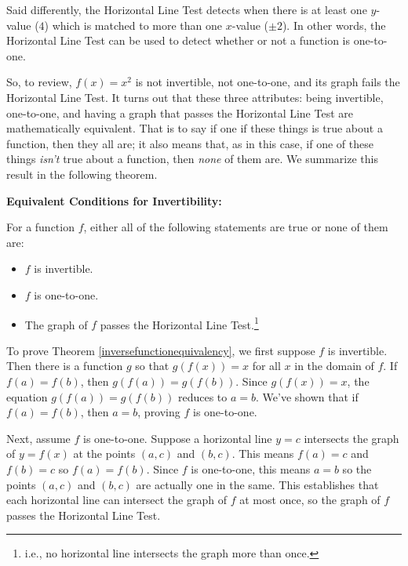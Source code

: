 \documentclass{ximera}
\begin{document}
Said differently, the Horizontal Line Test detects when there is at least one $y$-value ($4$) which is matched to more than one $x$-value ($\pm 2$).   In other words, the Horizontal Line Test can be used to detect whether or not a function is one-to-one. 

So, to review, $f(x) = x^2$ is not invertible, not one-to-one, and its graph fails the Horizontal Line Test. It turns out that these three attributes:  being invertible, one-to-one, and having a graph that passes the Horizontal Line Test are mathematically equivalent.   That is to say if one if these things is true about a function, then they all are; it also means that, as in this case,  if one of these things \textit{isn't} true about a function, then \textit{none} of them are.  We summarize this result in the following theorem.


\begin{theorem} \label{inversefunctionequivalency} \textbf{Equivalent Conditions for Invertibility:}  
 
For a function $f$, either all of the following statements are true or none of them are:

\begin{itemize}

\item  $f$ is invertible.

\item $f$ is one-to-one.

\item  The graph of $f$ passes the Horizontal Line Test.\footnote{i.e., no horizontal line intersects the graph more than once.}

\end{itemize}

\end{theorem}

To prove Theorem \ref{inversefunctionequivalency}, we first suppose $f$ is invertible.  Then there is a function $g$ so that $g(f(x)) = x$ for all $x$ in the domain of $f$.    If $f(a) = f(b)$, then $g(f(a)) = g(f(b))$.  Since $g(f(x)) = x$, the equation $g(f(a)) = g(f(b))$ reduces to $a = b$. We've shown that if $f(a) = f(b)$, then $a = b$, proving $f$ is one-to-one.

Next, assume $f$ is one-to-one.  Suppose a horizontal line $y=c$ intersects the graph of $y = f(x)$ at the points $(a,c)$ and $(b,c)$.  This means $f(a) = c$ and $f(b) = c$ so $f(a) = f(b)$.  Since $f$ is one-to-one, this means $a=b$ so the points $(a,c)$ and $(b,c)$ are actually one in the same.  This establishes that each horizontal line can intersect the graph of $f$ at most once, so the graph of $f$ passes the Horizontal Line Test.
\end{document}
